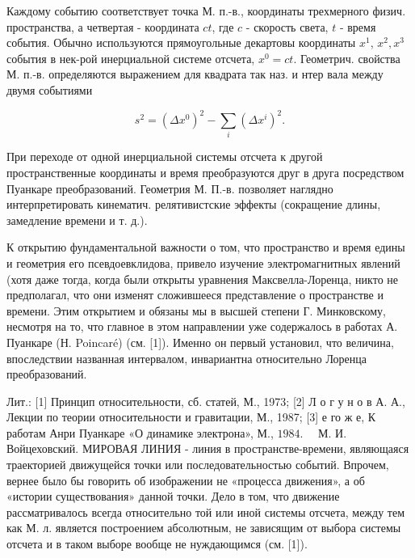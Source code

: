 \documentclass[10pt]{article}
\begin{document}
Каждому событию соответствует точка М. п.-в., координаты трехмерного физич. пространства, а четвертая - координата $c t$, где $c$ - скорость света, $t$ - время события. Обычно используются прямоугольные декартовы координаты $x^{1}$, $x^{2}, x^{3}$ события в нек-рой инерциальной системе отсчета, $x^{0}=c t$. Геометрич. свойства М. п.-в. определяются выражением для квадрата так наз. и нтер вала между двумя событиями



\[

s^{2}=\left(\Delta x^{0}\right)^{2}-\sum_{i}\left(\Delta x^{i}\right)^{2} .

\]



При переходе от одной инерциальной системы отсчета к другой пространственные координаты и время преобразуются друг в друга посредством Пуанкаре преобразований. Геометрия М. П.-в. позволяет наглядно интерпретировать кинематич. релятивистские эффекты (сокращение длины, замедление времени и т. д.).



К открытию фундаментальной важности о том, что пространство и время едины и геометрия его псевдоевклидова, привело изучение электромагнитных явлений (хотя даже тогда, когда были открыты уравнения Максвелла-Лоренца, никто не предполагал, что они изменят сложившееся представление о пространстве и времени. Этим открытием и обязаны мы в высшей степени Г. Минковскому, несмотря на то, что главное в этом направлении уже содержалось в работах А. Пуанкаре (Н. Poincaré) (см. [1]). Именно он первый установил, что величина, впоследствии названная интервалом, инвариантна относительно Лоренца преобразований.



Лит.: [1] Принцип относительности, сб. статей, М., 1973; [2] Л о г у н о в А. А., Лекции по теории относительности и гравитации, М., 1987; [3] е го ж е, К работам Анри Пуанкаре «О динамике электрона», М., $1984 . \quad$ М. И. Войцеховский. МИРОВАЯ ЛИНИЯ - линия в пространстве-времени, являющаяся траекторией движущейся точки или последовательностью событий. Впрочем, вернее было бы говорить об изображении не «процесса движения», а об «истории существования» данной точки. Дело в том, что движение рассматривалось всегда относительно той или иной системы отсчета, между тем как М. л. является построением абсолютным, не зависящим от выбора системы отсчета и в таком выборе вообще не нуждающимся (см. [1]).
\end{document}
